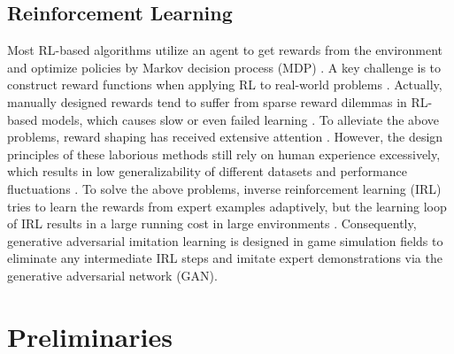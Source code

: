 \documentclass[sigconf,natbib=true]{acmart}
\begin{document}
\subsection{Reinforcement Learning}
Most RL-based algorithms utilize an agent to get rewards from the environment and optimize policies by Markov decision process (MDP) \cite{RLH, MMKGR}. A key challenge is to construct reward functions when applying RL to real-world problems \cite{rewardRL}. Actually, manually designed rewards tend to suffer from sparse reward dilemmas in RL-based models, which causes slow or even failed learning \cite{MultiHop, rewardRLcon}. To alleviate the above problems, reward shaping has received extensive attention \cite{generaRL}. However, the design principles of these laborious methods still rely on human experience excessively, which results in low generalizability of different datasets and performance fluctuations \cite{RLregener, RLrewardBal}. To solve the above problems, inverse reinforcement learning (IRL) tries to learn the rewards from expert examples adaptively, but the learning loop of IRL results in a large running cost in large environments \cite{IRL}. Consequently, generative adversarial imitation learning is designed in game simulation fields to eliminate any intermediate IRL steps and imitate expert demonstrations via the generative adversarial network (GAN). %




\section{Preliminaries}
\end{document}
